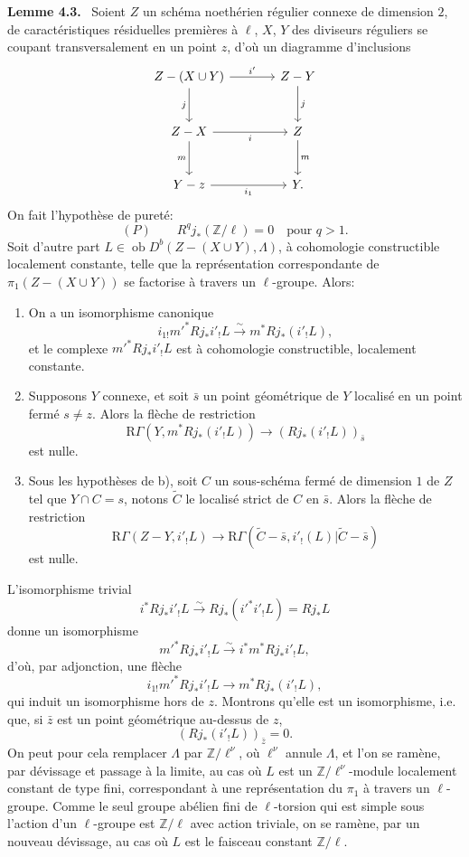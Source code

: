 \documentclass[11pt]{article}
\newenvironment{statement}[1]{\par\medskip\noindent\textbf{#1.}\ }{\par\medskip}
\providecommand{\Ob}{\operatorname{ob}}
\providecommand{\Ob}{\operatorname{ob}}
\providecommand{\Ob}{\operatorname{Ob}}
\providecommand{\Ob}{\operatorname{ob}}
\providecommand{\Ob}{\operatorname{Ob}}
\begin{document}
\begin{statement}{Lemme 4.3}
Soient $Z$ un schéma noethérien régulier connexe de dimension $2$, de caractéristiques résiduelles premières à $\ell$, $X$, $Y$ des diviseurs réguliers se coupant transversalement en un point $z$, d'où un diagramme d'inclusions
\[
\begin{tikzcd}[column sep=large,row sep=large]
Z-(X\cup Y) \arrow[r,"i'"] \arrow[d,"j"'] & Z-Y \arrow[d,"j"]\\
Z-X \arrow[r,"i"'] \arrow[d,"m"'] & Z \arrow[d,"m"]\\
Y-z \arrow[r,"i_1"'] & Y .
\end{tikzcd}
\]
On fait l'hypothèse de pureté:
\[
(P)\qquad R^qj_*(\mathbb Z/\ell)=0\quad\text{pour }q>1.
\]
Soit d'autre part $L\in\Ob D^b(Z-(X\cup Y),\Lambda)$, à cohomologie constructible localement constante, telle que la représentation correspondante de $\pi_1(Z-(X\cup Y))$ se factorise à travers un $\ell$-groupe. Alors:
\begin{enumerate}[label=\alph*)]
\item On a un isomorphisme canonique
\[
i_{1!}m'^*Rj_*i'_!L\xrightarrow{\sim} m^*Rj_*(i'_!L),
\]
et le complexe $m'^*Rj_*i'_!L$ est à cohomologie constructible, localement constante.
\item Supposons $Y$ connexe, et soit $\bar s$ un point géométrique de $Y$ localisé en un point fermé $s\ne z$. Alors la flèche de restriction
\begin{equation}
\mathrm R\Gamma(Y,m^*Rj_*(i'_!L))\longrightarrow (Rj_*(i'_!L))_{\bar s}
\tag{4.3.1}
\end{equation}
est nulle.
\item Sous les hypothèses de b), soit $C$ un sous-schéma fermé de dimension $1$ de $Z$ tel que $Y\cap C=s$, notons $\widetilde C$ le localisé strict de $C$ en $\bar s$. Alors la flèche de restriction
\begin{equation}
\mathrm R\Gamma(Z-Y,i'_!L)
\longrightarrow
\mathrm R\Gamma(\widetilde C-\bar s,i'_!(L)|\widetilde C-\bar s)
\tag{4.3.2}
\end{equation}
est nulle.
\end{enumerate}
\end{statement}

L'isomorphisme trivial
\[
i^*Rj_*i'_!L\xrightarrow{\sim}Rj_*(i'^*i'_!L)=Rj_*L
\]
donne un isomorphisme
\[
m'^*Rj_*i'_!L\xrightarrow{\sim} i^*m^*Rj_*i'_!L,
\]
d'où, par adjonction, une flèche
\[
i_{1!}m'^*Rj_*i'_!L\longrightarrow m^*Rj_*(i'_!L),
\]
qui induit un isomorphisme hors de $z$. Montrons qu'elle est un isomorphisme, i.e. que, si $\bar z$ est un point géométrique au-dessus de $z$,
\[
(Rj_*(i'_!L))_{\bar z}=0.
\]
On peut pour cela remplacer $\Lambda$ par $\mathbb Z/\ell^\nu$, où $\ell^\nu$ annule $\Lambda$, et l'on se ramène, par dévissage et passage à la limite, au cas où $L$ est un $\mathbb Z/\ell^\nu$-module localement constant de type fini, correspondant à une représentation du $\pi_1$ à travers un $\ell$-groupe. Comme le seul groupe abélien fini de $\ell$-torsion qui est simple sous l'action d'un $\ell$-groupe est $\mathbb Z/\ell$ avec action triviale, on se ramène, par un nouveau dévissage, au cas où $L$ est le faisceau constant $\mathbb Z/\ell$.
\end{document}
